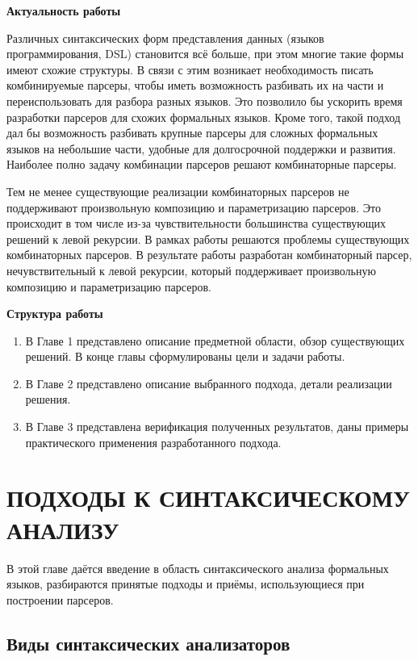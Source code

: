 \documentclass[times]{itmo-student-thesis}
\begin{document}
\tableofcontents

\startprefacepage
\textbf{Актуальность работы}

Различных синтаксических форм представления данных (языков программирования, DSL) становится всё больше, при этом
многие такие формы имеют схожие структуры. В связи с этим возникает необходимость писать комбинируемые парсеры, чтобы
иметь возможность разбивать их на части и переиспользовать для разбора разных языков. Это позволило бы ускорить время
разработки парсеров для схожих формальных языков. Кроме того, такой подход дал бы возможность разбивать крупные парсеры
для сложных формальных языков на небольшие части, удобные для долгосрочной поддержки и развития. Наиболее полно задачу
комбинации парсеров решают комбинаторные парсеры. 

Тем не менее существующие реализации комбинаторных парсеров не поддерживают произвольную композицию и параметризацию
парсеров. Это происходит в том числе из-за чувствительности большинства существующих решений к левой рекурсии. В рамках
работы решаются проблемы существующих комбинаторных парсеров. В результате работы разработан комбинаторный парсер,
нечувствительный к левой рекурсии, который поддерживает произвольную композицию и параметризацию парсеров.

\textbf{Структура работы}

\begin{enumerate}
    \item В Главе 1 представлено описание предметной области, обзор существующих решений. В конце главы сформулированы 
    цели и задачи работы.
    \item В Главе 2 представлено описание выбранного подхода, детали реализации решения.
    \item В Главе 3 представлена верификация полученных результатов, даны примеры практического применения 
    разработанного подхода.
\end{enumerate}

\chapter{ПОДХОДЫ К СИНТАКСИЧЕСКОМУ АНАЛИЗУ}

В этой главе даётся введение в область синтаксического анализа формальных языков, разбираются принятые подходы и приёмы, 
использующиеся при построении парсеров.

\section{Виды синтаксических анализаторов}\label{sec:parsing_approaches}
\end{document}
